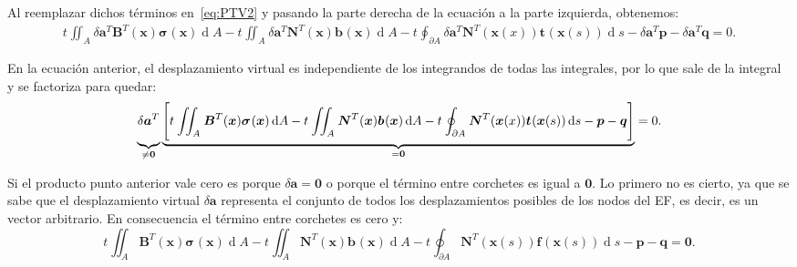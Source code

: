 \documentclass[12pt,letterpaper, landscape]{article}
\newcommand{\e}{{}}
\newcommand{\ve}[1]{{\boldsymbol{#1}}}
\newcommand{\ma}[1]{{\boldsymbol{#1}}}
\newcommand{\dd}{\operatorname{d} \!}
\begin{document}
Al reemplazar dichos términos en~\eqref{eq:PTV2} y pasando la parte derecha de la ecuación a la parte izquierda, obtenemos:
\begin{align}
t^\e \iint_{A^\e} \delta\ve{a}^T \ma{B}^T(\ve{x}) \ve{\sigma}^\e(\ve{x}) \dd A - t^\e \iint_{A^\e} \delta\ve{a}^T \ma{N}^T(\ve{x}) \ve{b}^\e(\ve{x}) \dd A 
-  t^\e \oint_{\partial A^\e} \delta\ve{a}^T \ma{N}^T(\ve{x}(x)) \ve{t}^\e(\ve{x}(s)) \dd s  
- \delta\ve{a}^T \ve{p} - \delta\ve{a}^T \ve{q} = 0. \label{eq:PTV3}
\end{align}

En la ecuación anterior, el desplazamiento virtual es independiente de los integrandos de todas las integrales, por lo que sale de la integral y se factoriza para quedar:
\begin{equation}
\underbrace{\vphantom{\Bigg[}\delta\ve{a}^T}_{\neq\ve{0}} \underbrace{\Bigg[ t^\e \iint_{A^\e} \ma{B}^T(\ve{x}) \ve{\sigma}^\e(\ve{x}) \dd A - t^\e \iint_{A^\e}  \ma{N}^T(\ve{x}) \ve{b}^\e(\ve{x}) \dd A - t^\e \oint_{\partial A^\e} \ma{N}^T(\ve{x}(x)) \ve{t}^\e(\ve{x}(s)) \dd s - \ve{p} - \ve{q} \Bigg]}_{=\ve{0}}= 0. \label{eq:PTV3}
\end{equation}

Si el producto punto anterior vale cero es porque $\delta\ve{a} = \ve{0}$ o porque el término entre corchetes es igual a $\ve{0}$. Lo primero no es cierto, ya que se sabe que el desplazamiento virtual $\delta \ve{a}$ representa el conjunto de todos los desplazamientos posibles de los nodos del EF, es decir, es un vector arbitrario. En consecuencia el término entre corchetes es cero y:
\begin{equation}
 t^\e \iint_{A^\e}  \ma{B}^T(\ve{x})  \ve{\sigma}^\e(\ve{x}) \dd A - t^\e \iint_{A^\e}  \ma{N}^T(\ve{x}) \ve{b}^\e(\ve{x}) \dd A -  t^\e \oint_{\partial A^\e} \ma{N}^T(\ve{x}(s)) \ve{f}^\e(\ve{x}(s)) \dd s -  \ve{p} - \ve{q} = \ve{0}.
\end{equation}
\end{document}
